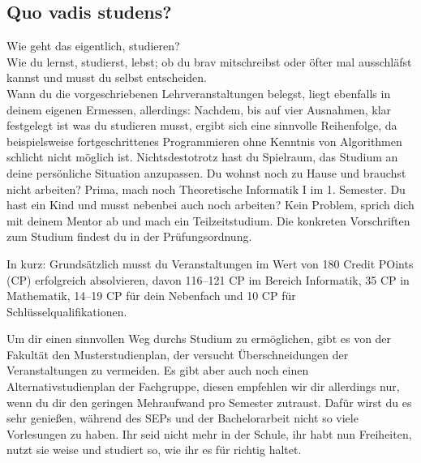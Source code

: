 \begin{multicols}{2}
\subsection{Quo vadis studens?}

Wie geht das eigentlich, studieren?\\
Wie du lernst, studierst, lebst; ob du brav mitschreibst oder öfter mal ausschläfst kannst und musst du selbst entscheiden. \\
Wann du die vorgeschriebenen Lehrveranstaltungen belegst, liegt ebenfalls in deinem eigenen Ermessen, allerdings: Nachdem, bis auf vier Ausnahmen, klar festgelegt ist was du studieren musst, ergibt sich eine sinnvolle Reihenfolge, da beispielsweise fortgeschrittenes Programmieren ohne Kenntnis von Algorithmen schlicht nicht möglich ist. Nichtsdestotrotz hast du Spielraum, das Studium an deine persönliche Situation anzupassen.
Du wohnst noch zu Hause und brauchst nicht arbeiten? Prima, mach noch Theoretische Informatik I im 1. Semester. Du hast ein Kind und musst nebenbei auch noch arbeiten? Kein Problem, sprich dich mit deinem Mentor ab und mach ein Teilzeitstudium. Die konkreten Vorschriften zum Studium findest du in der Prüfungsordnung.

In kurz: Grundsätzlich musst du Veranstaltungen im Wert von 180 Credit POints (CP) erfolgreich absolvieren, davon 116–121 CP im Bereich Informatik, 35 CP in Mathematik, 14–19 CP für dein Nebenfach und 10 CP für Schlüsselqualifikationen.

Um dir einen sinnvollen Weg durchs Studium zu ermöglichen, gibt es von der Fakultät den Musterstudienplan, der versucht Überschneidungen der Veranstaltungen zu vermeiden. Es gibt aber auch noch einen Alternativstudienplan der Fachgruppe, diesen empfehlen wir dir allerdings nur, wenn du dir den geringen Mehraufwand pro Semester zutraust. Dafür wirst du es sehr genießen, während des SEPs und der Bachelorarbeit nicht so viele Vorlesungen zu haben. 
Ihr seid nicht mehr in der Schule, ihr habt nun Freiheiten, nutzt sie weise und studiert so, wie ihr es für richtig haltet.
\end{multicols}